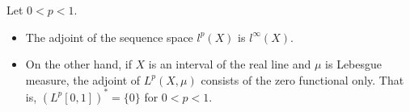 Let $0 < p < 1$.
\begin{itemize}
\item The adjoint of the sequence space $l^p(X)$ is $l^\infty(X)$.
\item On the other hand, if $X$ is an interval of the real line and $\mu$ is Lebesgue measure, the adjoint of $L^p(X, \mu)$ consists of the zero functional only. That is, $(L^p[0,1])^* = \{0\}$ for $0 < p < 1$.
\end{itemize}
